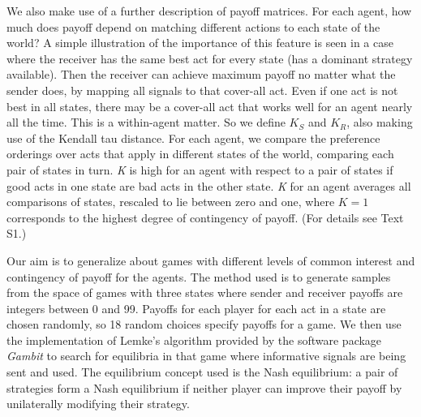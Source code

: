 \documentclass[10pt]{article}
\begin{document}
We also make use of a further description of payoff matrices. For each
agent, how much does payoff depend on matching different actions to each
state of the world? A simple illustration of the importance of this
feature is seen in a case where the receiver has the same best act for
every state (has a dominant strategy available). Then the receiver can
achieve maximum payoff no matter what the sender does, by mapping all
signals to that cover-all act. Even if one act is not best in all
states, there may be a cover-all act that works well for an agent nearly
all the time. This is a within-agent matter. So we define $K_S$ and
$K_R$, also making use of the Kendall tau distance. For each agent, we
compare the preference orderings over acts that apply in different
states of the world, comparing each pair of states in turn. \emph{K} is
high for an agent with respect to a pair of states if good acts in one
state are bad acts in the other state. \emph{K} for an agent averages
all comparisons of states, rescaled to lie between zero and one, where
$K=1$ corresponds to the highest degree of contingency of payoff. (For
details see Text S1.)

Our aim is to generalize about games with different levels of common
interest and contingency of payoff for the agents. The method used is to
generate samples from the space of games with three states where sender
and receiver payoffs are integers between 0 and 99. Payoffs for each
player for each act in a state are chosen randomly, so 18 random choices
specify payoffs for a game. We then use the implementation of Lemke's
\cite{Lemke1965} algorithm provided by the software package \emph{Gambit} \cite{McKelvey2010} to
search for equilibria in that game where informative signals are being
sent and used. The equilibrium concept used is the Nash equilibrium: a
pair of strategies form a Nash equilibrium if neither player can improve
their payoff by unilaterally modifying their strategy.
\end{document}
